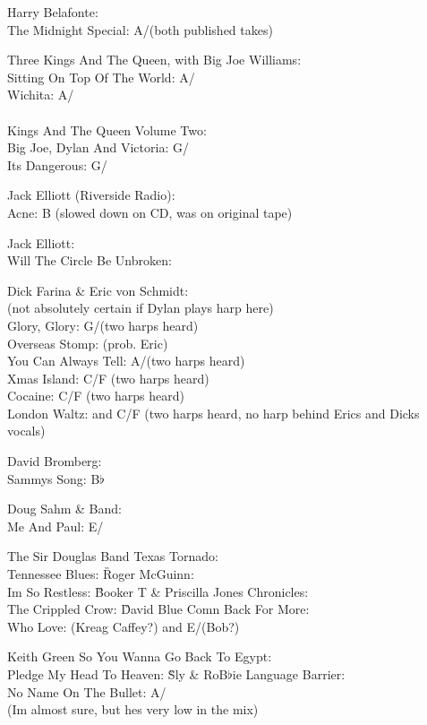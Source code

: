 \documentclass[a4paper,twoside]{memoir}
\begin{document}
Harry Belafonte: \\ The Midnight Special: A/\D (both published takes)


Three Kings And The Queen, with Big Joe Williams: \\ Sitting On Top Of
The World: A/\D\\ Wichita: A/\D\\
\\
Kings And The Queen Volume Two: \\ Big Joe, Dylan And Victoria: G/\C\\
Its Dangerous: G/\C


Jack Elliott (Riverside Radio): \\ Acne: B (slowed down on CD, was \C
on original tape)


Jack Elliott: \\ Will The Circle Be Unbroken: \D


Dick Farina \& Eric von Schmidt: \\ (not absolutely certain if Dylan
plays harp here)\\ Glory, Glory: G/\C (two harps heard)\\ Overseas
Stomp: \C (prob. Eric)\\ You Can Always Tell: A/\D (two harps heard)\\
Xmas Island: C/F (two harps heard)\\ Cocaine: C/F (two harps heard)\\
London Waltz: \C and C/F (two harps heard, no harp behind Erics and
Dicks vocals)


David Bromberg: \\ Sammys Song: B$\flat$


Doug Sahm \& Band: \\ Me And Paul: E/\A


The Sir Douglas Band Texas Tornado: \\ Tennessee Blues: \G


Roger McGuinn: \\ Im So Restless: \G


Booker T \& Priscilla Jones Chronicles: \\ The Crippled Crow: \G


David Blue Comn Back For More: \\ Who Love: \E (Kreag Caffey?) and
E/\A (Bob?)


Keith Green So You Wanna Go Back To Egypt: \\ Pledge My Head To
Heaven: \G


Sly \& RoB$\flat$ie Language Barrier: \\ No Name On The Bullet: A/\G\\
(Im almost sure, but hes very low in the mix)
\end{document}
